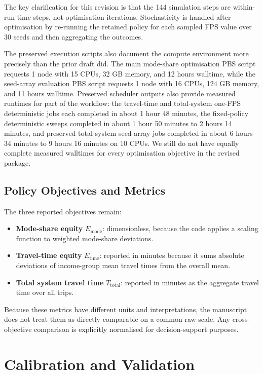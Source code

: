 The key clarification for this revision is that the 144 simulation steps are within-run time steps, not optimisation iterations. Stochasticity is handled after optimisation by re-running the retained policy for each sampled FPS value over 30 seeds and then aggregating the outcomes.

The preserved execution scripts also document the compute environment more precisely than the prior draft did. The main mode-share optimisation PBS script requests 1 node with 15 CPUs, 32 GB memory, and 12 hours walltime, while the seed-array evaluation PBS script requests 1 node with 16 CPUs, 124 GB memory, and 11 hours walltime. Preserved scheduler outputs also provide measured runtimes for part of the workflow: the travel-time and total-system one-FPS deterministic jobs each completed in about 1 hour 48 minutes, the fixed-policy deterministic sweeps completed in about 1 hour 50 minutes to 2 hours 14 minutes, and preserved total-system seed-array jobs completed in about 6 hours 34 minutes to 9 hours 16 minutes on 10 CPUs. We still do not have equally complete measured walltimes for every optimisation objective in the revised package.

\subsection{Policy Objectives and Metrics}
\label{subsec:policy_objectives}
The three reported objectives remain:

\begin{itemize}
    \item \textbf{Mode-share equity} $E_{\text{mode}}$: dimensionless, because the code applies a scaling function to weighted mode-share deviations.
    \item \textbf{Travel-time equity} $E_{\text{time}}$: reported in minutes because it sums absolute deviations of income-group mean travel times from the overall mean.
    \item \textbf{Total system travel time} $T_{\text{total}}$: reported in minutes as the aggregate travel time over all trips.
\end{itemize}

Because these metrics have different units and interpretations, the manuscript does not treat them as directly comparable on a common raw scale. Any cross-objective comparison is explicitly normalised for decision-support purposes.

\section{Calibration and Validation}
\label{app:calibration_validation}

